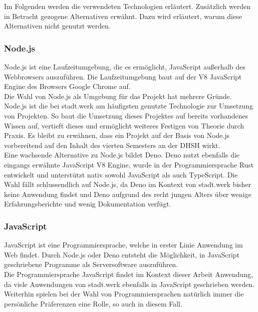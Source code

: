 \documentclass[a4paper]{scrartcl}
\begin{document}
Im Folgenden werden die verwendeten Technologien erläutert. Zusätzlich werden in Betracht gezogene Alternativen erwähnt. Dazu wird erläutert, warum diese Alternativen nicht genutzt werden.

\subsubsection{Node.js}
Node.js ist eine Laufzeitumgebung, die es ermöglicht, JavaScript außerhalb des Webbrowsers auszuführen. Die Laufzeitumgebung baut auf der V8 JavaScript Engine des Browsers Google Chrome auf. \\
Die Wahl von Node.js als Umgebung für das Projekt hat mehrere Gründe. Node.js ist die bei stadt.werk am häufigsten genutzte Technologie zur Umsetzung von Projekten. So baut die Umsetzung dieses Projektes auf bereits vorhandenes Wissen auf, vertieft dieses und ermöglicht weiteres Festigen von Theorie durch Praxis. Es bleibt zu erwähnen, dass ein Projekt auf der Basis von Node.js vorbereitend auf den Inhalt des vierten Semesters an der DHSH wirkt. \\

Eine wachsende Alternative zu Node.js bildet Deno. Deno nutzt ebenfalls die eingangs erwähnte JavaScript V8 Engine, wurde in der Programmiersprache Rust entwickelt und unterstützt nativ sowohl JavaScript als auch TypeScript. Die Wahl fällt schlussendlich auf Node.js, da Deno im Kontext von stadt.werk bisher keine Anwendung findet und Deno aufgrund des recht jungen Alters über wenige Erfahrungsberichte und wenig Dokumentation verfügt.

\subsubsection{JavaScript}
JavaScript ist eine Programmiersprache, welche in erster Linie Anwendung im Web findet. Durch Node.js oder Deno entsteht die Möglichkeit, in JavaScript geschriebene Programme als Serversoftware auszuführen. \\
Die Programmiersprache JavaScript findet im Kontext dieser Arbeit Anwendung, da viele Anwendungen von stadt.werk ebenfalls in JavaScript geschrieben werden. Weiterhin spielen bei der Wahl von Programmiersprachen natürlich immer die persönliche Präferenzen eine Rolle, so auch in diesem Fall. \\
\end{document}
